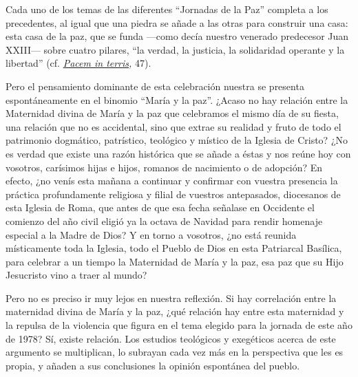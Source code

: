Cada uno de los temas de las diferentes ``Jornadas de la Paz'' completa
a los precedentes, al igual que una piedra se añade a las otras para
construir una casa: esta casa de la paz, que se funda ---como decía
nuestro venerado predecesor Juan XXIII--- sobre cuatro pilares, ``la
verdad, la justicia, la solidaridad operante y la libertad'' (cf.
\emph{\href{/content/john-xxiii/es/encyclicals/documents/hf_j-xxiii_enc_11041963_pacem.html}{Pacem
		in terris},} 47).

Pero el pensamiento dominante de esta celebración nuestra se presenta
espontáneamente en el binomio ``María y la paz''. ¿Acaso no hay relación
entre la Maternidad divina de María y la paz que celebramos el mismo día
de su fiesta, una relación que no es accidental, sino que extrae su
realidad y fruto de todo el patrimonio dogmático, patrístico, teológico
y místico de la Iglesia de Cristo? ¿No es verdad que existe una razón
histórica que se añade a éstas y nos reúne hoy con vosotros, carísimos
hijas e hijos, romanos de nacimiento o de adopción? En efecto, ¿no venís
esta mañana a continuar y confirmar con vuestra presencia la práctica
profundamente religiosa y filial de vuestros antepasados, diocesanos de
esta Iglesia de Roma, que antes de que esa fecha señalase en Occidente
el comienzo del año civil eligió ya la octava de Navidad para rendir
homenaje especial a la Madre de Dios? Y en torno a vosotros, ¿no está
reunida místicamente toda la Iglesia, todo el Pueblo de Dios en esta
Patriarcal Basílica, para celebrar a un tiempo la Maternidad de María y
la paz, esa paz que su Hijo Jesucristo vino a traer al mundo?

Pero no es preciso ir muy lejos en nuestra reflexión. Si hay correlación
entre la maternidad divina de María y la paz, ¿qué relación hay entre
esta maternidad y la repulsa de la violencia que figura en el tema
elegido para la jornada de este año de 1978? Sí, existe relación. Los
estudios teológicos y exegéticos acerca de este argumento se
multiplican, lo subrayan cada vez más en la perspectiva que les es
propia, y añaden a sus conclusiones la opinión espontánea del pueblo.


